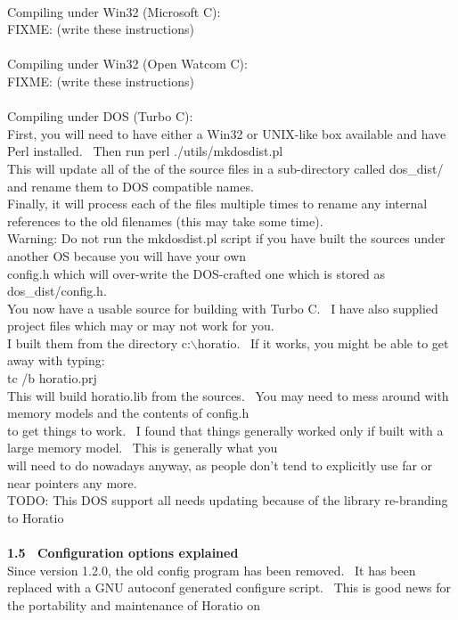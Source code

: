 \documentclass{article}
\begin{document}
\\
Compiling under Win32 (Microsoft C):\\
FIXME: (write these instructions)\\
\\
Compiling under Win32 (Open Watcom C):\\
FIXME: (write these instructions)\\
\\
Compiling under DOS (Turbo C):\\
First, you will need to have
either a Win32 or UNIX-like box available and have Perl
installed.~ Then run perl ./utils/mkdosdist.pl\\
This will update all of the of the source files in a sub-directory
called dos\_dist/ and rename them to DOS compatible names.\\
Finally, it will process each of the files multiple times to rename any
internal references to the old filenames (this may take some time).\\
Warning: Do not run the mkdosdist.pl script if you have built the
sources under another OS because you will have your own\\
config.h which will over-write the DOS-crafted one which is stored as
dos\_dist/config.h.\\
You now have a usable source for building with Turbo C.~ I have
also supplied project files which may or may not work for you.\\
I built them from the directory c:$\backslash$horatio.~ If it works, you
might be able to get away with typing:\\
tc /b horatio.prj\\
This will build horatio.lib from the sources.~ You may need to
mess around with memory models and the contents of config.h\\
to get things to work.~ I found that things generally worked only
if built with a large memory model.~ This is generally what you\\
will need to do nowadays anyway, as people don't tend to explicitly use
far or near pointers any more.\\
TODO: This DOS support all needs updating because of the library re-branding to Horatio\\
\\
\textbf{1.5~ Configuration options explained}
\\
Since version 1.2.0, the old config program has been removed.~ It
has been replaced with a GNU autoconf generated configure script.~
This is good news for the portability and maintenance of Horatio on
\end{document}
